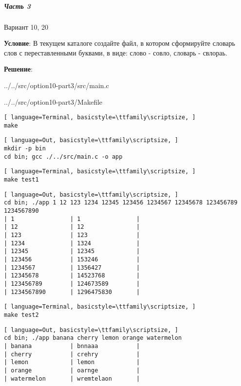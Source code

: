 \subparagraph{Часть 3} Вариант 10, 20

\textbf{Условие}:
В текущем каталоге создайте файл, в котором сформируйте словарь слов с переставленными буквами, в виде:
слово - совло,
словарь - свлораь.

\textbf{Решение}:


{../../src/option10-part3/src/main.c}


{../../src/option10-part3/Makefile}


\begin{lstlisting}[ language=Terminal, basicstyle=\ttfamily\scriptsize, ]
make
\end{lstlisting}

\begin{lstlisting}[ language=Out, basicstyle=\ttfamily\scriptsize, ]
mkdir -p bin
cd bin; gcc ./../src/main.c -o app
\end{lstlisting}


\begin{lstlisting}[ language=Terminal, basicstyle=\ttfamily\scriptsize, ]
make test1
\end{lstlisting}

\begin{lstlisting}[ language=Out, basicstyle=\ttfamily\scriptsize, ]
cd bin; ./app 1 12 123 1234 12345 123456 1234567 12345678 123456789 1234567890
| 1                | 1                |
| 12               | 12               |
| 123              | 123              |
| 1234             | 1324             |
| 12345            | 12345            |
| 123456           | 153246           |
| 1234567          | 1356427          |
| 12345678         | 14523768         |
| 123456789        | 124673589        |
| 1234567890       | 1296475830       |
\end{lstlisting}


\begin{lstlisting}[ language=Terminal, basicstyle=\ttfamily\scriptsize, ]
make test2
\end{lstlisting}

\begin{lstlisting}[ language=Out, basicstyle=\ttfamily\scriptsize, ]
cd bin; ./app banana cherry lemon orange watermelon
| banana           | bnnaaa           |
| cherry           | crehry           |
| lemon            | lemon            |
| orange           | oarnge           |
| watermelon       | wremtelaon       |
\end{lstlisting}
